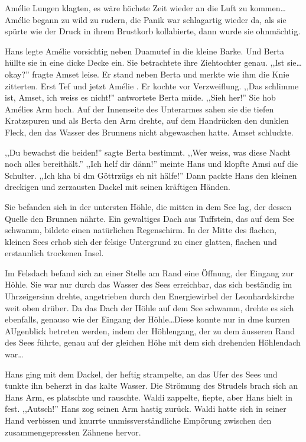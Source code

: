 \documentclass[11pt,titlepage,a5paper]{book}
\newcommand{\am}{Amélie }
\begin{document}
\am Lungen klagten, es wäre höchste Zeit wieder an die Luft zu kommen\dots \am begann zu wild zu rudern, die Panik war schlagartig wieder da, als sie spürte wie der Druck in ihrem Brustkorb kollabierte, dann wurde sie ohnmächtig. 

Hans legte \am vorsichtig neben Duamutef in die kleine Barke. Und Berta hüllte sie in eine dicke Decke ein. Sie betrachtete ihre Ziehtochter genau. ,,Ist sie\dots okay?'' fragte Amset leise. Er stand neben Berta und merkte wie ihm die Knie zitterten. Erst Tef und jetzt \am . Er kochte vor Verzweiflung. ,,Das schlimme ist, Amset, ich weiss es nicht!'' antwortete Berta müde. ,,Sieh her!'' Sie hob Amélies Arm hoch. Auf der Innenseite des Unterarmes sahen sie die tiefen Kratzspuren und als Berta den Arm drehte, auf dem Handrücken den dunklen Fleck, den das Wasser des Brunnens nicht abgewaschen hatte. Amset schluckte.

,,Du bewachst die beiden!'' sagte Berta bestimmt. ,,Wer weiss, was diese Nacht noch alles bereithält.'' ,,Ich helf dir dänn!'' meinte Hans und klopfte Amsi auf die Schulter. ,,Ich kha bi dm Göttrzügs eh nit hälfe!'' Dann packte Hans den kleinen dreckigen und zerzausten Dackel mit seinen kräftigen Händen. 

Sie befanden sich in der untersten Höhle, die mitten in dem See lag, der dessen Quelle den Brunnen nährte. Ein gewaltiges Dach aus Tuffstein, das auf dem See schwamm, bildete einen natürlichen Regenschirm. In der Mitte des flachen, kleinen Sees erhob sich der felsige Untergrund zu einer glatten, flachen und erstaunlich trockenen Insel.

Im Felsdach befand sich an einer Stelle am Rand eine Öffnung, der Eingang zur Höhle. Sie war nur durch das Wasser des Sees erreichbar, das sich beständig im Uhrzeigersinn drehte, angetrieben durch den Energiewirbel der Leonhardskirche weit oben drüber. Da das Dach der Höhle auf dem See schwamm, drehte es sich ebenfalls, genauso wie der Eingang der Höhle\dots Diese konnte nur in dme kurzen AUgenblick betreten werden, indem der Höhlengang, der zu dem äusseren Rand des Sees führte, genau auf der gleichen Höhe mit dem sich drehenden Höhlendach war\dots

Hans ging mit dem Dackel, der heftig strampelte, an das Ufer des Sees und tunkte ihn beherzt in das kalte Wasser. Die Strömung des Strudels brach sich an Hans Arm, es platschte und rauschte. Waldi zappelte,  fiepte, aber Hans hielt in fest. ,,Autsch!'' Hans zog seinen Arm hastig zurück. Waldi hatte sich in seiner Hand verbissen und knurrte unmissverständliche Empörung zwischen den zusammengepressten Zähnene hervor.
\end{document}
